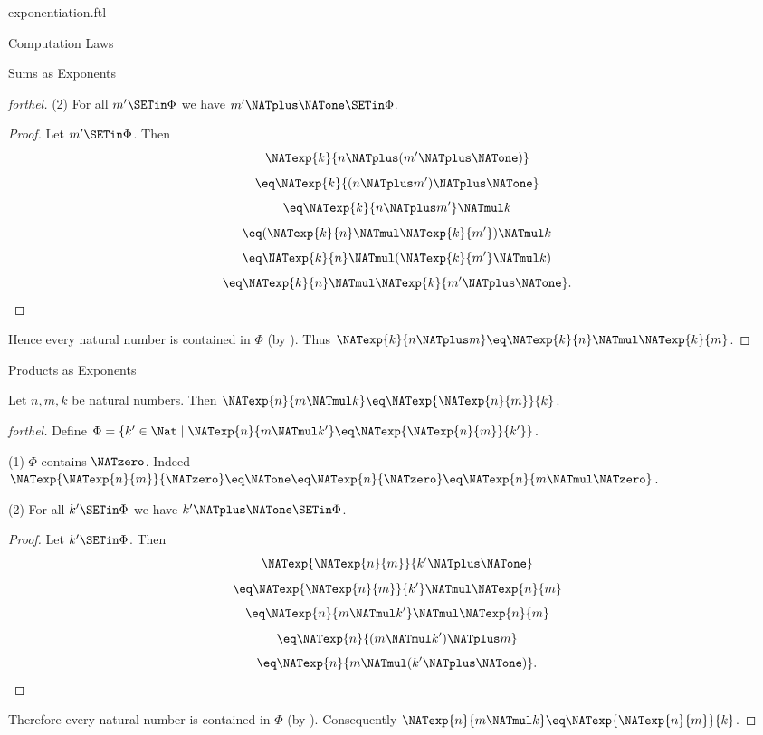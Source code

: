 \documentclass{naproche-library}
\begin{document}
\begin{smodule}[title=Exponentiation]{exponentiation.ftl}
\begin{sfragment}{Computation Laws}
\begin{sfragment}{Sums as Exponents}
\begin{proof}[forthel]
      (2) For all $m' \SETin \Phi$ we have $m' \NATplus \NATone \SETin \Phi$.
      \begin{proof}
        Let $m' \SETin \Phi$.
        Then
        \[  \NATexp{k}{n \NATplus (m' \NATplus \NATone)}                  \]
        \[    \eq \NATexp{k}{(n \NATplus m') \NATplus \NATone}              \]
        \[    \eq \NATexp{k}{n \NATplus m'} \NATmul k            \]
        \[    \eq (\NATexp{k}{n} \NATmul \NATexp{k}{m'}) \NATmul k  \]
        \[    \eq \NATexp{k}{n} \NATmul (\NATexp{k}{m'} \NATmul k)  \]
        \[    \eq \NATexp{k}{n} \NATmul \NATexp{k}{m' \NATplus \NATone}.       \]
      \end{proof}

      Hence every natural number is contained in $\Phi$ (by ).
      Thus $\NATexp{k}{n \NATplus m} \eq \NATexp{k}{n} \NATmul \NATexp{k}{m}$.
    \end{proof}
  \end{sfragment}

  \begin{sfragment}{Products as Exponents}
    \begin{proposition}[forthel,id=ARITHMETIC_09_7827956571308032]
      Let $n, m, k$ be natural numbers.
      Then $\NATexp{n}{m \NATmul k} \eq \NATexp{\NATexp{n}{m}}{k}$.
    \end{proposition}
    \begin{proof}[forthel]
      Define $\Phi = \{ k' \in \Nat \mid \NATexp{n}{m \NATmul k'} \eq \NATexp{\NATexp{n}{m}}{k'} \}$.

      (1) $\Phi$ contains $\NATzero$.
      Indeed $\NATexp{\NATexp{n}{m}}{\NATzero}
        \eq \NATone
        \eq \NATexp{n}{\NATzero}
        \eq \NATexp{n}{m \NATmul \NATzero}$.

      (2) For all $k' \SETin \Phi$ we have $k' \NATplus \NATone \SETin \Phi$.
      \begin{proof}
        Let $k' \SETin \Phi$.
        Then
        \[  \NATexp{\NATexp{n}{m}}{k' \NATplus \NATone}                \]
        \[    \eq \NATexp{\NATexp{n}{m}}{k'} \NATmul \NATexp{n}{m}    \]
        \[    \eq \NATexp{n}{m \NATmul k'} \NATmul \NATexp{n}{m}  \]
        \[    \eq \NATexp{n}{(m \NATmul k') \NATplus m}        \]
        \[    \eq \NATexp{n}{m \NATmul (k' \NATplus \NATone)}.       \]
      \end{proof}

      Therefore every natural number is contained in $\Phi$ (by ).
      Consequently $\NATexp{n}{m \NATmul k} \eq \NATexp{\NATexp{n}{m}}{k}$.
    \end{proof}
  \end{sfragment}


\end{sfragment}
\end{smodule}
\end{document}

